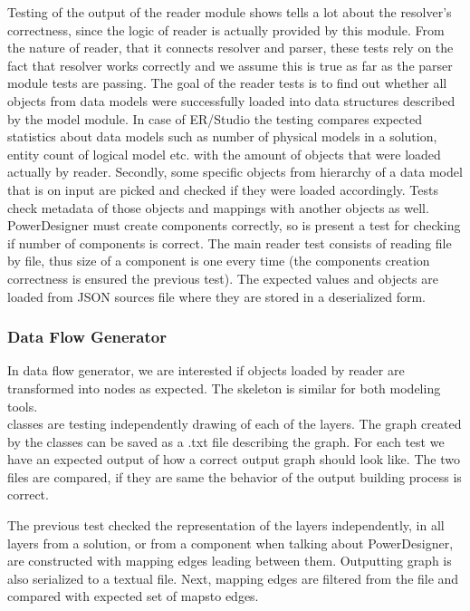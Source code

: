 Testing of the output of the reader module shows tells a lot about the resolver's correctness, since the logic of reader is actually provided by this module. 
From the nature of reader, that it connects resolver and parser, these tests rely on the fact that resolver works correctly and we assume this is true as far as the parser module tests are passing.
The goal of the reader tests is to find out whether all objects from data models were successfully loaded into data structures described by the model module.
In case of ER/Studio the testing compares expected statistics about data models such as number of physical models in a solution, entity count of logical model etc. with the amount of objects that were loaded actually by reader.
Secondly, some specific objects from hierarchy of a data model that is on input are picked and checked if they were loaded accordingly. Tests check metadata of those objects and mappings with another objects as well. \\ 

PowerDesigner must create components correctly, so is present a test for checking if number of components is correct.
The main reader test consists of reading file by file, thus size of a component is one every time (the components creation correctness is ensured the previous test).
The expected values and objects are loaded from JSON sources file where they are stored in a deserialized form.

\subsubsection{Data Flow Generator}

In data flow generator, we are interested if objects loaded by reader are transformed into nodes as expected.
The skeleton is similar for both modeling tools. \\

 classes are testing independently drawing of each of the layers. The graph created by the  classes can be saved as a .txt file describing the graph. 
For each test we have an expected output of how a correct output graph should look like. The two files are compared, if they are same the behavior of the output building process is correct.

The previous test checked the representation of the layers independently, in  all layers from a solution, or from a component when talking about PowerDesigner, are constructed with mapping edges leading between them. Outputting graph is also serialized to a textual file. Next, mapping edges are filtered from the file and compared with expected set of maps\textunderscore to edges. 



